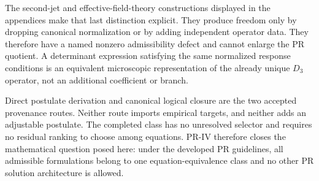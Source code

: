 The second-jet and effective-field-theory constructions displayed in the appendices make that last distinction explicit.  They produce freedom only by dropping canonical normalization or by adding independent operator data. They therefore have a named nonzero admissibility defect and cannot enlarge
the PR quotient.  A determinant expression satisfying the same normalized response conditions is an equivalent microscopic representation of the already unique $D_3$ operator, not an additional coefficient or branch.

Direct postulate derivation and canonical logical closure are the two accepted provenance routes.  Neither route imports empirical targets, and neither adds an adjustable postulate.  The completed class has no unresolved selector and requires no residual ranking to choose among equations.  PR-IV therefore closes the mathematical question posed here: under the developed PR guidelines, all admissible formulations belong to one equation-equivalence class and no other PR solution architecture is allowed.
